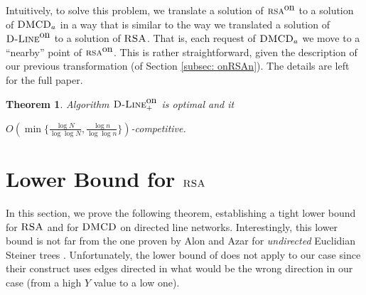 \documentclass[11pt]{article}
\newtheorem{theorem}{Theorem}[section]
\newcommand{\DMCD}{\mbox{\sc DMCD}}
\newcommand{\RSA}{\mbox{\sc RSA}}
\newcommand{\onRSA}{\mbox{\sc rsa}^{\mbox{\upshape on}}}
\newcommand{\Dlineon}[0]{\mbox{{\sc D-Line}}^{\mbox{\upshape on}}}
\newcommand{\Dlineonp}{\mbox{\sc D-Line}_+^{\mbox{\upshape on}}}
\begin{document}
Intuitively, to solve this problem, we translate a solution of $\onRSA$ to a solution of $\DMCD_a$ in a way that is similar to the way we translated a solution of $\Dlineon$ to a solution of $\RSA$. That is,  each request of $\DMCD_a$ we move to a ``nearby'' point of $\onRSA$. This is rather straightforward, given the description of our previous transformation (of Section \ref{subsec: onRSAn}).
The details are left for the full paper.




\begin{theorem}
Algorithm $\Dlineonp$ is optimal and it
\begin{center}
$O(\min\{\frac{\log N}{\log\log N},\frac{\log n}{\log \log n}\})$-competitive.
\end{center}
\end{theorem}














\vspace{-0.2cm}
\section{Lower Bound for $\RSA$}


\label{sec:Lower bound}



In this section, we prove the following theorem, establishing a tight lower bound for $\RSA$ and for $\DMCD$ on directed line networks.
Interestingly,  this lower bound is not far from the one proven by Alon and Azar  for {\em undirected} Euclidian Steiner trees \cite{AlonAzar93}.
Unfortunately,  the lower bound of \cite{AlonAzar93} does not apply to our case since their construct uses edges directed in what would be the wrong direction in our case (from a high $Y$ value to a low one).
\end{document}
